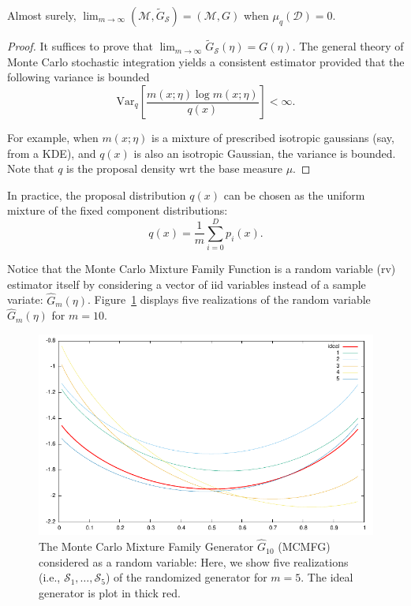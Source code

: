 \documentclass[graybox]{svmult}
\def\calD{\mathcal{D}}
\def\Var{\mathrm{Var}}
\def\Var{\mathrm{Var}}
\def\tildeG{\tilde{G}}
\def\hatG{\hat{G}}
\def\calS{\mathcal{S}}
\def\calM{\mathcal{M}}
\begin{document}
\begin{theorem}
Almost surely, $\lim_{m\rightarrow\infty} (\calM,\tildeG_{\calS}) = (\calM,G)$ when $\mu_q(\calD)=0$.
\end{theorem}
\begin{proof}
It suffices to prove that $\lim_{m\rightarrow\infty} \tildeG_{\calS}(\eta) = G(\eta)$.
The general theory of Monte Carlo stochastic integration yields a consistent estimator provided that the following variance is bounded
\begin{equation}
\Var_q\left[\frac{m(x;\eta)\log m(x;\eta)}{q(x)}\right]<\infty.
\end{equation}
 
For example, when $m(x;\eta)$ is a mixture of prescribed isotropic gaussians (say, from a KDE), and $q(x)$ is also an isotropic Gaussian, the variance is bounded.
Note that $q$ is the proposal density wrt the base measure $\mu$.
\end{proof}

In practice, the proposal distribution $q(x)$ can be chosen as the uniform  mixture of the fixed component distributions: 
\begin{equation}
q(x)=\frac{1}{m} \sum_{i=0}^D p_i(x).
\end{equation}


Notice that the Monte Carlo Mixture Family Function is a random variable (rv) estimator itself by considering a vector of iid variables instead of a sample variate: $\hatG_m(\eta)$.
Figure~\ref{fig:MCMFBG1D} displays five realizations of the random variable $\hatG_m(\eta)$ for $m=10$.


\begin{figure}%
\centering

%

\includegraphics[width=0.8\columnwidth]{plotZ.pdf}%

\caption{The Monte Carlo Mixture Family Generator $\hatG_{10}$ (MCMFG) considered as a random variable: Here, we show five realizations (i.e., $\calS_1,\ldots,\calS_5$) of the randomized generator for $m=5$. The ideal generator is plot in thick red.
 }%
\label{fig:MCMFBG1D}%
\end{figure}
\end{document}
